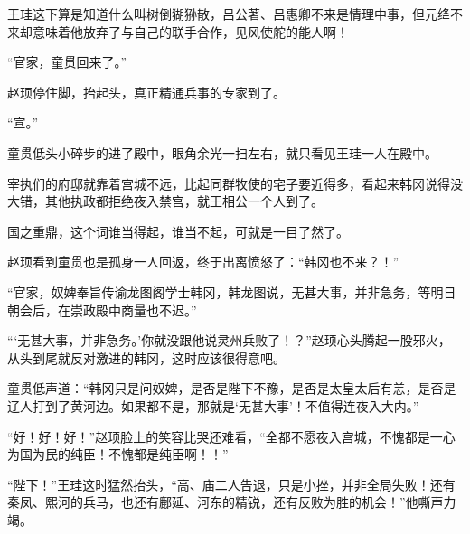王珪这下算是知道什么叫树倒猢狲散，吕公著、吕惠卿不来是情理中事，但元绛不来却意味着他放弃了与自己的联手合作，见风使舵的能人啊！

“官家，童贯回来了。”

赵顼停住脚，抬起头，真正精通兵事的专家到了。

“宣。”

童贯低头小碎步的进了殿中，眼角余光一扫左右，就只看见王珪一人在殿中。

宰执们的府邸就靠着宫城不远，比起同群牧使的宅子要近得多，看起来韩冈说得没大错，其他执政都拒绝夜入禁宫，就王相公一个人到了。

国之重鼎，这个词谁当得起，谁当不起，可就是一目了然了。

赵顼看到童贯也是孤身一人回返，终于出离愤怒了：“韩冈也不来？！”

“官家，奴婢奉旨传谕龙图阁学士韩冈，韩龙图说，无甚大事，并非急务，等明日朝会后，在崇政殿中商量也不迟。”

“‘无甚大事，并非急务。’你就没跟他说灵州兵败了！？”赵顼心头腾起一股邪火，从头到尾就反对激进的韩冈，这时应该很得意吧。

童贯低声道：“韩冈只是问奴婢，是否是陛下不豫，是否是太皇太后有恙，是否是辽人打到了黄河边。如果都不是，那就是‘无甚大事’！不值得连夜入大内。”

“好！好！好！”赵顼脸上的笑容比哭还难看，“全都不愿夜入宫城，不愧都是一心为国为民的纯臣！不愧都是纯臣啊！！”

“陛下！”王珪这时猛然抬头，“高、庙二人告退，只是小挫，并非全局失败！还有秦凤、熙河的兵马，也还有鄜延、河东的精锐，还有反败为胜的机会！”他嘶声力竭。

